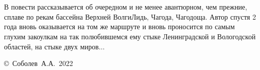 \chapter*{}

В повести рассказывается об очередном и не менее авантюрном, чем прежние, сплаве по рекам бассейна Верхней Волги\mdash Лидь, Чагода, Чагодоща. Автор спустя 2 года вновь оказывается на том же маршруте и вновь проносится по самым глухим закоулкам на так полюбившемся ему стыке Ленинградской и Вологодской областей, на стыке двух миров$\ldots$ 

\vspace{\fill}
\begin{flushright}
	\copyright~Соболев~А.А.~2022
\end{flushright}